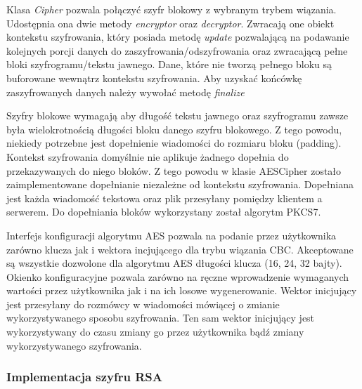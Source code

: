 \documentclass{article}
\begin{document}
      Klasa \emph{Cipher} pozwala połączyć szyfr blokowy z wybranym trybem wiązania. Udostępnia ona dwie metody
      \emph{encryptor} oraz \emph{decryptor}. Zwracają one obiekt kontekstu szyfrowania, który posiada metodę \emph{update}
      pozwalającą na podawanie kolejnych porcji danych do zaszyfrowania/odszyfrowania oraz zwracającą pełne bloki
      szyfrogramu/tekstu jawnego. Dane, które nie tworzą pełnego bloku są buforowane wewnątrz kontekstu szyfrowania.
      Aby uzyskać końcówkę zaszyfrowanych danych należy wywołać metodę \emph{finalize}

      Szyfry blokowe wymagają aby długość tekstu jawnego oraz szyfrogramu zawsze była wielokrotnością długości bloku
      danego szyfru blokowego. Z tego powodu, niekiedy potrzebne jest dopełnienie wiadomości do rozmiaru bloku (padding).
      Kontekst szyfrowania domyślnie nie aplikuje żadnego dopełnia do przekazywanych do niego bloków. Z tego powodu
      w klasie AESCipher zostało zaimplementowane dopełnianie niezależne od kontekstu szyfrowania. Dopełniana jest
      każda wiadomość tekstowa oraz plik przesyłany pomiędzy klientem a serwerem. Do dopełniania bloków wykorzystany został
      algorytm PKCS7.

      Interfejs konfiguracji algorytmu AES pozwala na podanie przez użytkownika zarówno klucza jak i wektora incjującego
      dla trybu wiązania CBC. Akceptowane są wszystkie dozwolone dla algorytmu AES długości klucza (16, 24, 32 bajty).
      Okienko konfiguracyjne pozwala zarówno na ręczne wprowadzenie wymaganych wartości przez użytkownika jak i na ich
      losowe wygenerowanie. Wektor inicjujący jest przesyłany do rozmówcy w wiadomości mówiącej o zmianie wykorzystywanego
      sposobu szyfrowania. Ten sam wektor inicjujący jest wykorzystywany do czasu zmiany go przez użytkownika bądź zmiany
      wykorzystywanego szyfrowania.

    \subsubsection{Implementacja szyfru RSA}
\end{document}
